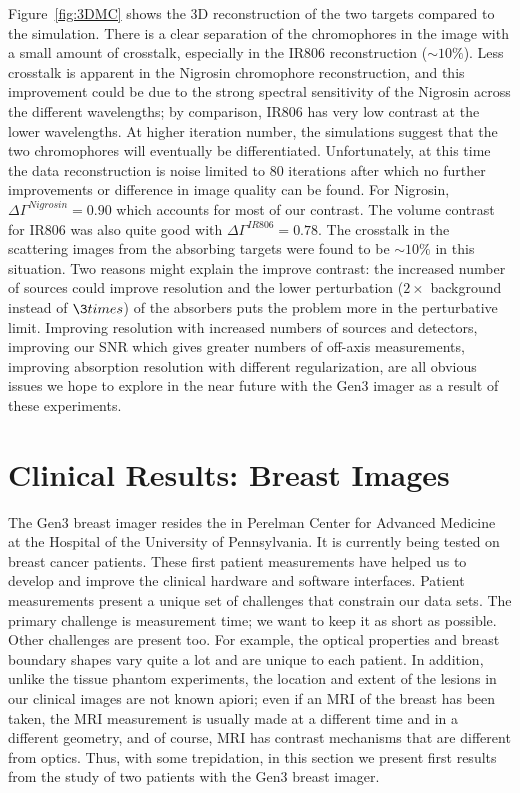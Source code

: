 Figure~\ref{fig:3DMC} shows the 3D reconstruction of the two targets compared to the simulation. There is a clear separation of the chromophores in the image with a small amount of crosstalk, especially in the IR806 reconstruction ($\sim10\%$). Less crosstalk is apparent in the Nigrosin chromophore reconstruction, and this improvement could be due to the strong spectral sensitivity of the Nigrosin across the different wavelengths; by comparison, IR806 has very low contrast at the lower wavelengths. At higher iteration number, the simulations suggest that the two chromophores will eventually be differentiated. Unfortunately, at this time the data reconstruction is noise limited to 80 iterations after which no further improvements or difference in image quality can be found. For Nigrosin, $\Delta\Gamma^{Nigrosin} = 0.90$ which accounts for most of our contrast. The volume contrast for IR806 was also quite good with $\Delta\Gamma^{IR806} = 0.78$. The crosstalk in the scattering images from the absorbing targets were found to be $\sim10\%$ in this situation. Two reasons might explain the improve contrast: the increased number of sources could improve resolution and the lower perturbation ($2\times$ background instead of $\3times$) of the absorbers puts the problem more in the perturbative limit. Improving resolution with increased numbers of sources and detectors, improving our SNR which gives greater numbers of off-axis measurements, improving absorption resolution with different regularization, are all obvious issues we hope to explore in the near future with the Gen3 imager as a result of these experiments.
\floatbarrier
\section{Clinical Results: Breast Images}
The Gen3 breast imager resides the in Perelman Center for Advanced Medicine at the Hospital of the University of Pennsylvania. It is currently being tested on breast cancer patients. These first patient measurements have helped us to develop and improve the clinical hardware and software interfaces. Patient measurements present a unique set of challenges that constrain our data sets. The primary challenge is measurement time; we want to keep it as short as possible. Other challenges are present too. For example, the optical properties and breast boundary shapes vary quite a lot and are unique to each patient. In addition, unlike the tissue phantom experiments, the location and extent of the lesions in our clinical images are not known apiori; even if an MRI of the breast has been taken, the MRI measurement is usually made at a different time and in a different geometry, and of course, MRI has contrast mechanisms that are different from optics. Thus, with some trepidation, in this section we present first results from the study of two patients with the Gen3 breast imager.
%
